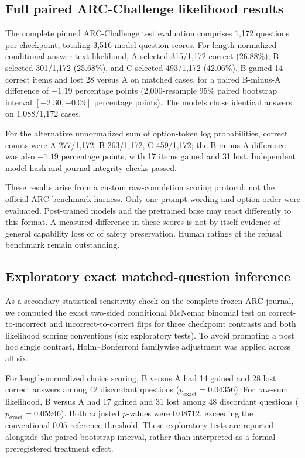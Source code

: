 \documentclass[11pt]{article}
\begin{document}
\subsection{Full paired ARC-Challenge likelihood results}
The complete pinned ARC-Challenge test evaluation comprises
1,172 questions per checkpoint, totaling 3,516 model-question
scores. For length-normalized conditional answer-text likelihood,
A selected 315/1,172 correct (26.88\%), B selected 301/1,172
(25.68\%), and C selected 493/1,172 (42.06\%).
B gained 14 correct items and lost 28 versus A on matched cases,
for a paired B-minus-A difference of $-1.19$ percentage points
(2,000-resample 95\% paired bootstrap interval
$[-2.30,-0.09]$ percentage points). The models chose identical
answers on 1,088/1,172 cases.

For the alternative unnormalized sum of option-token log
probabilities, correct counts were A 277/1,172, B 263/1,172,
C 459/1,172; the B-minus-A difference was also $-1.19$
percentage points, with 17 items gained and 31 lost.
Independent model-hash and journal-integrity checks passed.

These results arise from a custom raw-completion scoring
protocol, not the official ARC benchmark harness. Only one
prompt wording and option order were evaluated. Post-trained
models and the pretrained base may react differently to this
format. A measured difference in these scores is not by itself
evidence of general capability loss or of safety preservation.
Human ratings of the refusal benchmark remain outstanding.

\subsection{Exploratory exact matched-question inference}
As a secondary statistical sensitivity check on the complete
frozen ARC journal, we computed the exact two-sided conditional
McNemar binomial test on correct-to-incorrect and
incorrect-to-correct flips for three checkpoint contrasts and
both likelihood scoring conventions (six exploratory tests).
To avoid promoting a post hoc single contrast, Holm--Bonferroni
familywise adjustment was applied across all six.

For length-normalized choice scoring, B versus A had 14
gained and 28 lost correct answers among 42 discordant
questions ($p_{\mathrm{exact}}=0.04356$). For raw-sum likelihood,
B versus A had 17 gained and 31 lost among 48 discordant
questions ($p_{\mathrm{exact}}=0.05946$). Both adjusted
$p$-values were $0.08712$, exceeding the conventional
$0.05$ reference threshold. These exploratory tests are
reported alongside the paired bootstrap interval, rather
than interpreted as a formal preregistered treatment effect.
\end{document}
